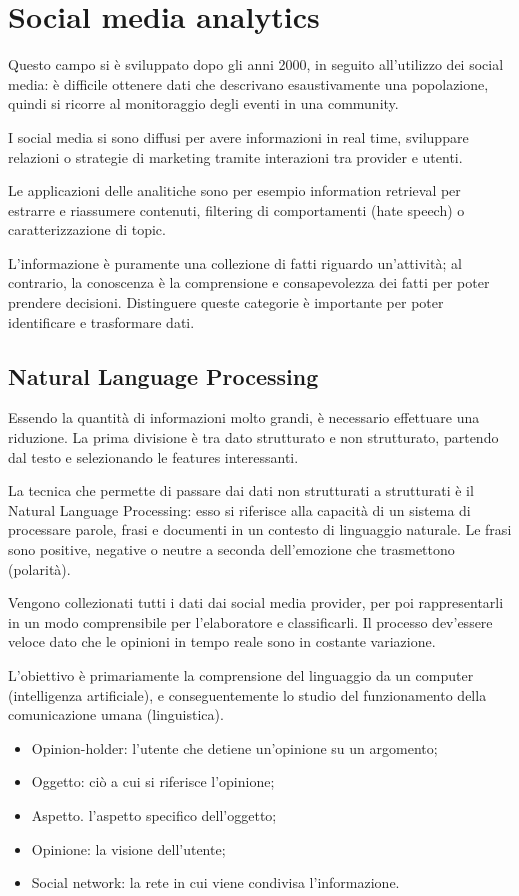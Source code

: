 \section{Social media analytics}
Questo campo si è sviluppato dopo gli anni 2000, in seguito all'utilizzo dei social media: è difficile ottenere dati che descrivano esaustivamente una popolazione, quindi si ricorre al monitoraggio degli eventi in una community.

I social media si sono diffusi per avere informazioni in real time, sviluppare relazioni o strategie di marketing tramite interazioni tra provider e utenti. 

Le applicazioni delle analitiche sono per esempio information retrieval per estrarre e riassumere contenuti, filtering di comportamenti (hate speech) o caratterizzazione di topic.

L'informazione è puramente una collezione di fatti riguardo un'attività; al contrario, la conoscenza è la comprensione e consapevolezza dei fatti per poter prendere decisioni. Distinguere queste categorie è importante per poter identificare e trasformare dati.

\subsection{Natural Language Processing}
Essendo la quantità di informazioni molto grandi, è necessario effettuare una riduzione. La prima divisione è tra dato strutturato e non strutturato, partendo dal testo e selezionando le features interessanti. 

La tecnica che permette di passare dai dati non strutturati a strutturati è il Natural Language Processing: esso si riferisce alla capacità di un sistema di processare parole, frasi e documenti in un contesto di linguaggio naturale. Le frasi sono positive, negative o neutre a seconda dell'emozione che trasmettono (polarità).

Vengono collezionati tutti i dati dai social media provider, per poi rappresentarli in un modo comprensibile per l'elaboratore e classificarli. Il processo dev'essere veloce dato che le opinioni in tempo reale sono in costante variazione.

L'obiettivo è primariamente la comprensione del linguaggio da un computer (intelligenza artificiale), e conseguentemente lo studio del funzionamento della comunicazione umana (linguistica).

\begin{itemize}
	\item Opinion-holder: l'utente che detiene un'opinione su un argomento;
	\item Oggetto: ciò a cui si riferisce l'opinione;
	\item Aspetto. l'aspetto specifico dell'oggetto;
	\item Opinione: la visione dell'utente;
	\item Social network: la rete in cui viene condivisa l'informazione.
\end{itemize}

